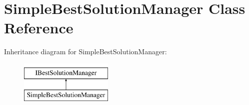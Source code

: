 \hypertarget{classSimpleBestSolutionManager}{\section{\-Simple\-Best\-Solution\-Manager \-Class \-Reference}
\label{classSimpleBestSolutionManager}
}
\-Inheritance diagram for \-Simple\-Best\-Solution\-Manager\-:\begin{figure}[H]
\begin{center}
\leavevmode
\includegraphics[height=2.000000cm]{classSimpleBestSolutionManager}
\end{center}
\end{figure}

